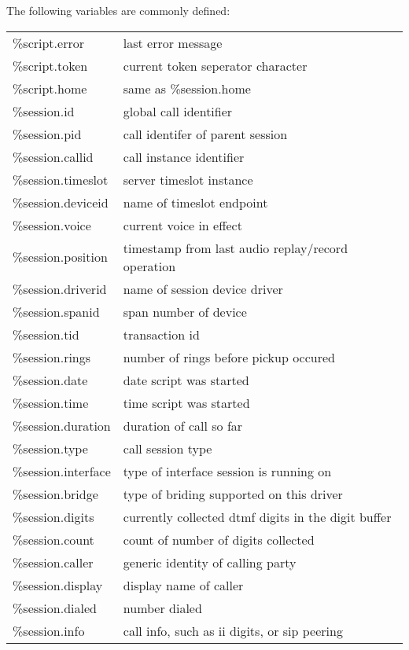 \documentclass[a4paper,12pt]{article}
\begin{document}
The following variables are commonly defined: \\ 

\begin{supertabular}{ll}
\%script.error          & last error message \\
\%script.token          & current token seperator character \\
\%script.home           & same as \%session.home \\
\%session.id            & global call identifier \\
\%session.pid		& call identifer of parent session \\
\%session.callid	& call instance identifier \\
\%session.timeslot	& server timeslot instance \\
\%session.deviceid	& name of timeslot endpoint \\
\%session.voice		& current voice in effect \\
\%session.position	& timestamp from last audio replay/record operation \\
\%session.driverid	& name of session device driver \\
\%session.spanid	& span number of device \\
\%session.tid		& transaction id \\
\%session.rings		& number of rings before pickup occured \\
\%session.date          & date script was started \\
\%session.time          & time script was started \\
\%session.duration	& duration of call so far \\
\%session.type		& call session type \\
\%session.interface	& type of interface session is running on \\
\%session.bridge	& type of briding supported on this driver \\
\%session.digits        & currently collected dtmf digits in the digit buffer \\
\%session.count         & count of number of digits collected \\
\%session.caller        & generic identity of calling party \\
\%session.display	& display name of caller \\
\%session.dialed	& number dialed \\
\%session.info		& call info, such as ii digits, or sip peering \\

\end{supertabular}
\end{document}
